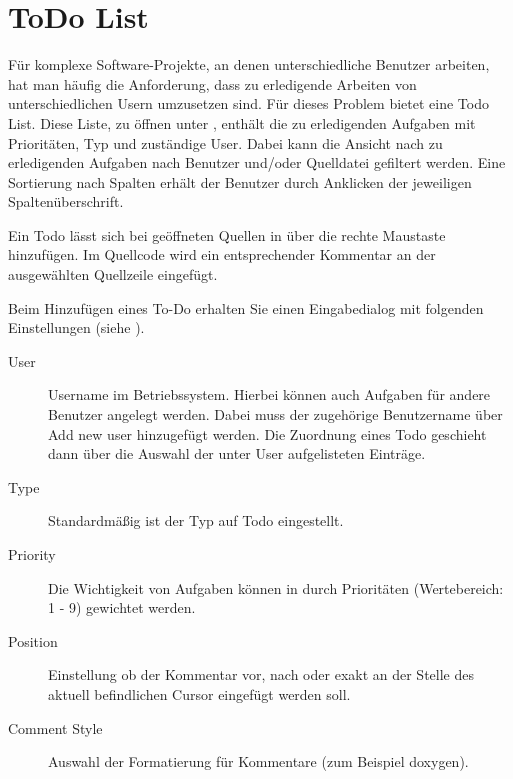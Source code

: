 \section{ToDo List}\label{sec:todo_list}

Für komplexe Software-Projekte, an denen unterschiedliche Benutzer arbeiten, hat man häufig die Anforderung, dass zu erledigende Arbeiten von unterschiedlichen Usern umzusetzen sind. Für dieses Problem bietet \codeblocks eine Todo List. Diese Liste, zu öffnen unter , enthält die zu erledigenden Aufgaben mit Prioritäten, Typ und zuständige User. Dabei kann die Ansicht nach zu erledigenden Aufgaben nach Benutzer und/oder Quelldatei gefiltert werden. Eine Sortierung nach Spalten erhält der Benutzer durch Anklicken der jeweiligen Spaltenüberschrift.



Ein Todo lässt sich bei geöffneten Quellen in \codeblocks über die rechte Maustaste  hinzufügen. Im Quellcode wird ein entsprechender Kommentar an der ausgewählten Quellzeile eingefügt.


Beim Hinzufügen eines To-Do erhalten Sie einen Eingabedialog mit folgenden Einstellungen (siehe ).


\begin{description}
\item[User] Username  im Betriebssystem. Hierbei können auch Aufgaben für andere Benutzer angelegt werden. Dabei muss der zugehörige Benutzername über Add new user hinzugefügt werden. Die Zuordnung eines Todo geschieht dann über die Auswahl der unter User aufgelisteten Einträge.

\item[Type] Standardmäßig ist der Typ auf Todo eingestellt.
\item[Priority] Die Wichtigkeit von Aufgaben können in \codeblocks durch Prioritäten (Wertebereich: 1 - 9) gewichtet werden.
\item[Position] Einstellung ob der Kommentar vor, nach oder exakt an der Stelle des aktuell befindlichen Cursor eingefügt werden soll.
\item[Comment Style] Auswahl der Formatierung für Kommentare (zum Beispiel doxygen).
\end{description}
